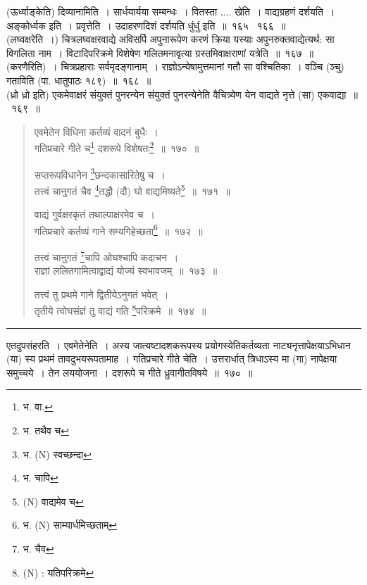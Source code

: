 \documentclass[11pt, openany]{book}
\begin{document}
(ऊर्ध्वाङ्केति) दिव्यानामिति~। सार्धयार्यया सम्बन्धः~। वितस्ता .... खेति~। वाद्यग्रहणं दर्शयति~। अङ्कोर्ध्वक इति~। प्रवृत्तेति~। उदाहरणदिशं दर्शयति धुंधुं इति~॥~१६५ \textendash\ १६६~॥\\

(लघ्वक्षरेति~।) चित्रलघ्वक्षरवाद्ये अविसर्पि अपुनारूपेण करणं क्रिया यस्याः अपुनरुक्तवाद्येत्यर्थ:  सा विगलिता नाम~। विटादिपरिक्रमे विशेषेण गलितमनावृत्या ग्रस्तमिवाक्षराणां यत्रेति~॥~१६७~॥\\

(करणैरिति)~। चित्रप्रहाराः सर्वमृदङ्गानाम्~। राज्ञोऽन्येषामुत्तमानां गतौ सा वश्चितिका~। वञ्चि  (ञ्चु) गताविति (पा. धातुपाठः १८९)~॥~१६८~॥\\

(ध्रो ध्रो इति) एकमेवाक्षरं संयुक्तं पुनरन्येन संयुक्तं पुनरन्येनेति वैचित्र्येण येन वाद्यते नृत्ते (सा) एकवाद्या~॥~१६९~॥

\newpage

\begin{quote}
{\na एवमेतेन विधिना कर्तव्यं वादनं बुधैः~।\\
गतिप्रचारे गीते च\renewcommand{\thefootnote}{1}\footnote{भ. वा.} दशरूपे विशेषतः\renewcommand{\thefootnote}{2}\footnote{भ. तथैव च}~॥~१७०~॥

सप्तरूपविधानेन \renewcommand{\thefootnote}{3}\footnote{भ. (N) स्वच्छन्दा}छन्दकासारितेषु च~।\\
तत्त्वं चानुगतं चैव \renewcommand{\thefootnote}{4}\footnote{भ. चापि}तद्धौ (दौ) घो वाद्यमिष्यते\renewcommand{\thefootnote}{4a}\footnote{(N) वाद्यमेव च}~॥~१७१~॥

वाद्यं गुर्वक्षरकृतं तथाल्पाक्षरमेव च~।\\
गतिप्रचारे कर्तव्यं गाने सम्यगिहेच्छता\renewcommand{\thefootnote}{5}\footnote{भ. (N) साम्यार्धमिच्छताम्}~॥~१७२~॥

तत्त्वं चानुगतं \renewcommand{\thefootnote}{6}\footnote{भ. चैव}चापि ओघश्चापि कदाचन~।\\
राज्ञां ललितगामित्वाद्वाद्यं योज्यं स्वभावजम्~॥~१७३~॥

तत्त्वं तु प्रथमे गाने द्वितीयेऽनुगतं भवेत्~।\\
तृतीये त्वोघसंज्ञं तु वाद्यं गति \renewcommand{\thefootnote}{7}\footnote{(N) : यतिपरिक्रमे}परिक्रमे~॥~१७४~॥}
\end{quote}

\hrule

\vspace{2mm}
{\qtt एतदुपसंहरति}~। एवमेतेनेति~। अस्य जात्यष्टादशकरूपस्य प्रयोगस्येतिकर्तव्यता नाट्यनृत्तापेक्षयाऽभिधान (या) स्य प्रथमं तावदुभयरूपतामाह~। गतिप्रचारे गीते चेति~। उत्तरार्धात् त्रिधाऽस्य मा (गा) नापेक्षया समुच्चये~। तेन लययोजना~। दशरूपे च गीते ध्रुवागीतविषये~॥~१७०~॥\\
\end{document}
